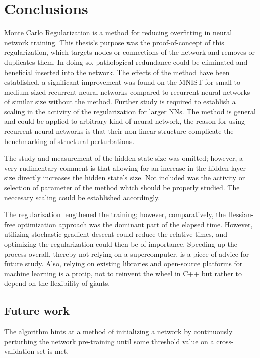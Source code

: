 \chapter{Conclusions}

Monte Carlo Regularization is a method for reducing overfitting in neural network training. This thesis's purpose was the proof-of-concept of this regularization, which targets nodes or connections of the network and removes or duplicates them. In doing so, pathological redundance could be eliminated and beneficial inserted into the network. The effects of the method have been established, a significant improvement was found on the MNIST for small to medium-sized recurrent neural networks compared to recurrent neural networks of similar size without the method. Further study is required to establish a scaling in the activity of the regularization for larger NNs. The method is general and could be applied to arbitrary kind of neural network, the reason for using recurrent neural networks is that their non-linear structure complicate the benchmarking of structural perturbations.

The study and measurement of the hidden state size was omitted; however, a very rudimentary comment is that allowing for an increase in the hidden layer size directly increases the hidden state's size. Not included was the activity or selection of parameter of the method which should be properly studied. The neccesary scaling could be established accordingly. 

The regularization lengthened the training; however, comparatively, the Hessian-free optimization approach was the dominant part of the elapsed time. However, utilizing stochastic gradient descent could reduce the relative times, and optimizing the regularization could then be of importance. Speeding up the process overall, thereby not relying on a supercomputer, is a piece of advice for future study. Also, relying on existing libraries and open-source platforms for machine learning is a protip, not to reinvent the wheel in C++ but rather to depend on the flexibility of giants.

\section{Future work}

The algorithm hints at a method of initializing a network by continuously perturbing the network pre-training until some threshold value on a cross-validation set is met. 

